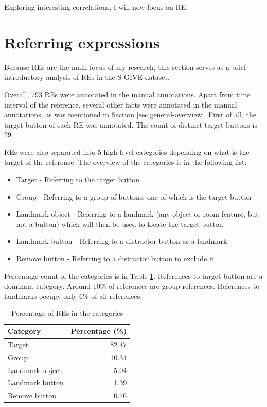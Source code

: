 Exploring interesting correlations, I will now focus on RE.

\section{Referring expressions}
Because REs are the main focus of my research, this section serves as a brief introductory analysis of REs in the S-GIVE dataset.

Overall, 793 REs were annotated in the manual annotations. Apart from time interval of the reference, several other facts were annotated in the manual annotations, as was mentioned in Section \ref{sec:general-overview}. First of all, the target button of each RE was annotated. The count of distinct target buttons is 29.  

REs were also separated into 5 high-level categories depending on what is the target of the reference. The  overview of the categories is in the following list:

\begin{itemize}
\item
Target - Referring to the target button
\item
Group - Referring to a group of buttons, one of which is the target button
\item
Landmark object - Referring to a landmark (any object or room feature, but not a button) which will then be used to locate the target button
\item
Landmark button - Referring to a distractor button as a landmark
\item
Remove button -  Referring to a distractor button to exclude it
\end{itemize}

Percentage count of the categories is in Table \ref{tab:res-groups}. References to target button are a dominant category. Around 10\% of references are group references. References to landmarks occupy only 6\% of all references.

\begin{table}[!htbp]
 \centering
\begin{tabular}{lr}
\toprule
Category  & Percentage (\%)  \\
\midrule
Target   		& 82.47\\
Group 			& 10.34\\
Landmark object 	& 5.04\\
Landmark button	& 1.39\\
Remove button 	& 0.76\\
\bottomrule
\end{tabular}
\caption{Percentage of REs in the categories}
\label{tab:res-groups}
\end{table} 

